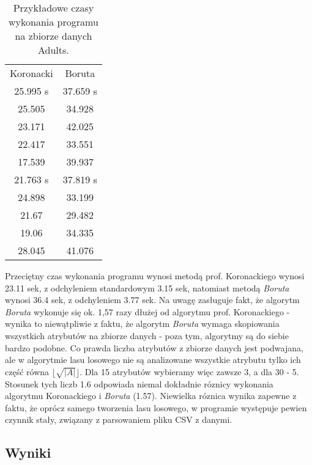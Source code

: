\documentclass{article}
\begin{document}
\begin{table} 
	\centering
	\begin{tabular}{|c|c|} \hline
		Koronacki & Boruta \\ 
		25.995 s & 37.659 s \\ 
		25.505 & 34.928 \\ 
		23.171 & 42.025 \\ 
		22.417 & 33.551 \\ 
		17.539 & 39.937 \\ 
		21.763 s & 37.819 s \\ 
		24.898 & 33.199 \\ 
		21.67 & 29.482 \\ 
		19.06 & 34.335 \\ 
		28.045 & 41.076 \\ \hline
	\end{tabular}
\caption{Przykładowe czasy wykonania programu na zbiorze danych Adults.}
\label{tab:times}
\end{table}

Przeciętny czas wykonania programu wynosi metodą prof. Koronackiego wynosi 23.11 sek, z odchyleniem standardowym 3.15 sek, natomiast metodą \emph{Boruta} wynosi 36.4 sek, z odchyleniem 3.77 sek. Na uwagę zasługuje fakt, że algorytm \emph{Boruta} wykonuje się ok. 1,57 razy dłużej od algorytmu prof. Koronackiego - wynika to niewątpliwie z faktu, że algorytm \emph{Boruta} wymaga skopiowania wszystkich atrybutów na zbiorze danych - poza tym, algorytmy są do siebie bardzo podobne. Co prawda liczba atrybutów z zbiorze danych jest podwajana, ale w algorytmie lasu losowego nie są analizowane wszystkie atrybutu tylko ich część równa $\lfloor\sqrt{\left|A\right|}\rfloor$. Dla 15 atrybutów wybieramy więc zawsze 3, a dla 30 - 5. Stosunek tych liczb 1.6 odpowiada niemal dokładnie róznicy wykonania algorytmu Koronackiego i \emph{Boruta} (1.57). Niewielka róznica wynika zapewne z faktu, że oprócz samego tworzenia lasu losowego, w programie występuje pewien czynnik stały, związany z parsowaniem pliku CSV z danymi. 

\subsection{Wyniki}
\end{document}
